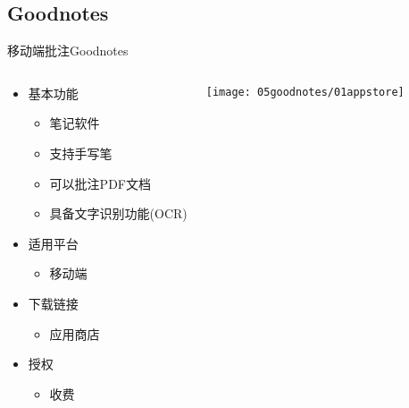\documentclass[fontset = none, t, aspectratio=169]{ctexbeamer}
\begin{document}
\subsection{Goodnotes}
\begin{frame}{移动端批注}{Goodnotes}
  \begin{columns}[c,onlytextwidth]
    \begin{spacing}{1.3}
    \begin{itemize}\itemsep=3pt
    \item 基本功能
      \begin{itemize}
      \item 笔记软件
      \item 支持手写笔
      \item 可以\alert{批注}PDF文档
      \item 具备文字识别功能(OCR)
      \end{itemize}
    \item 适用平台
      \begin{itemize}
      \item 移动端
      \end{itemize}
    \item 下载链接
      \begin{itemize}
      \item 应用商店
      \end{itemize}
    \item 授权
      \begin{itemize}
      \item \alert{收费}
      \end{itemize}
    \end{itemize}
    \end{spacing}
    \centering
    \texttt{[image: 05goodnotes/01appstore]}
  \end{columns}
\end{frame}
\end{document}

